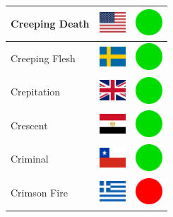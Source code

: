 \documentclass[12pt, a4paper, twoside]{report}
\begin{document}
\begin{center}
\begin{longtable}{|p{5cm}|p{2cm}|p{2cm}|}
 Creeping Death                                             & \includegraphics[width=1cm]{../img/flags/us} &   \includegraphics[width=1cm]{../likes/y} \\ \hline
 Creeping Flesh                                             & \includegraphics[width=1cm]{../img/flags/se} &   \includegraphics[width=1cm]{../likes/y} \\ \hline
 Crepitation                                                & \includegraphics[width=1cm]{../img/flags/gb} &   \includegraphics[width=1cm]{../likes/y} \\ \hline
 Crescent                                                   & \includegraphics[width=1cm]{../img/flags/eg} &   \includegraphics[width=1cm]{../likes/y} \\ \hline
 Criminal                                                   & \includegraphics[width=1cm]{../img/flags/cl} &   \includegraphics[width=1cm]{../likes/y} \\ \hline
 Crimson Fire                                               & \includegraphics[width=1cm]{../img/flags/gr} &   \includegraphics[width=1cm]{../likes/n} \\ \hline

\end{longtable}
\end{center}
\end{document}

